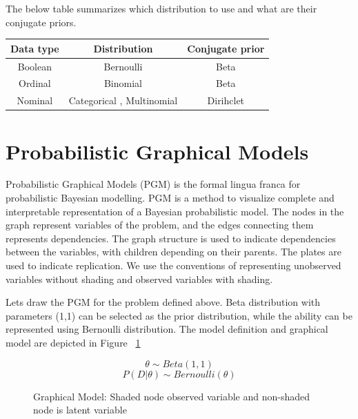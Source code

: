 The below table summarizes which distribution to use and what are their conjugate priors.

\begin{tabular}{|c|c|c|}
\hline
	\textbf{Data type} & \textbf{Distribution} & \textbf{Conjugate prior} \\
\hline
\hline
	Boolean & Bernoulli & Beta \\
\hline
	Ordinal & Binomial & Beta \\
\hline
	Nominal & Categorical , Multinomial & Dirihclet \\
\hline

\end{tabular}


\section{Probabilistic Graphical Models}

Probabilistic Graphical Models (PGM) is the formal lingua franca for probabilistic Bayesian modelling. PGM is a method to visualize complete and interpretable representation of a Bayesian probabilistic model. The nodes in the graph represent variables of the problem, and the edges connecting them represents dependencies. The graph structure is used to indicate dependencies between the variables, with children depending on their parents. The plates are used to indicate replication. We use the conventions of representing unobserved variables without shading and observed variables with shading.

Lets draw the PGM for the problem defined above. Beta distribution with parameters (1,1) can be selected as the prior distribution, while the ability can be represented using Bernoulli distribution. 
The model definition and graphical model are depicted in Figure ~\ref{fig:pgm}

\noindent
\begin{figure}[htp]

\begin{minipage}{0.3\textwidth}
\centering
{}
\end{minipage}%
\begin{minipage}{0.7\textwidth}
\begin{equation*}
	\theta \sim Beta(1,1) 
\end{equation*}
\begin{equation*}
	P(D|\theta) \sim Bernoulli(\theta)
\end{equation*}
\end{minipage}
\caption[Graphical Model]{Graphical Model: Shaded node observed variable and non-shaded node is latent variable}
\label{fig:pgm}
\end{figure}

